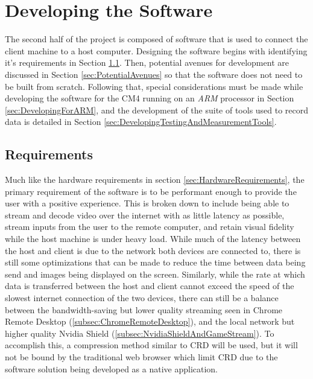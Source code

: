 \chapter{Developing the Software}

\label{Chapter5}

The second half of the project is composed of software that is used to connect the client machine to a host computer.
Designing the software begins with identifying it's requirements in Section \ref{sec:SoftwareRequirements}.
Then, potential avenues for development are discussed in Section \ref{sec:PotentialAvenues} so that the software does not need to be built from scratch.
Following that, special considerations must be made while developing the software for the CM4 running on an \emph{ARM} processor in Section \ref{sec:DevelopingForARM}, and the development of the suite of tools used to record data is detailed in Section \ref{sec:DevelopingTestingAndMeasurementTools}.


\section{Requirements}\label{sec:SoftwareRequirements}

Much like the hardware requirements in section \ref{sec:HardwareRequirements}, the primary requirement of the software is to be performant enough to provide the user with a positive experience.
This is broken down to include being able to stream and decode video over the internet with as little latency as possible, stream inputs from the user to the remote computer, and retain visual fidelity while the host machine is under heavy load.
While much of the latency between the host and client is due to the network both devices are connected to, there is still some optimizations that can be made to reduce the time between data being send and images being displayed on the screen.
Similarly, while the rate at which data is transferred between the host and client cannot exceed the speed of the slowest internet connection of the two devices, there can still be a balance between the bandwidth-saving but lower quality streaming seen in Chrome Remote Desktop (\ref{subsec:ChromeRemoteDesktop}), and the local network but higher quality Nvidia Shield (\ref{subsec:NvidiaShieldAndGameStream}).
To accomplish this, a compression method similar to CRD will be used, but it will not be bound by the traditional web browser which limit CRD due to the software solution being developed as a native application.

